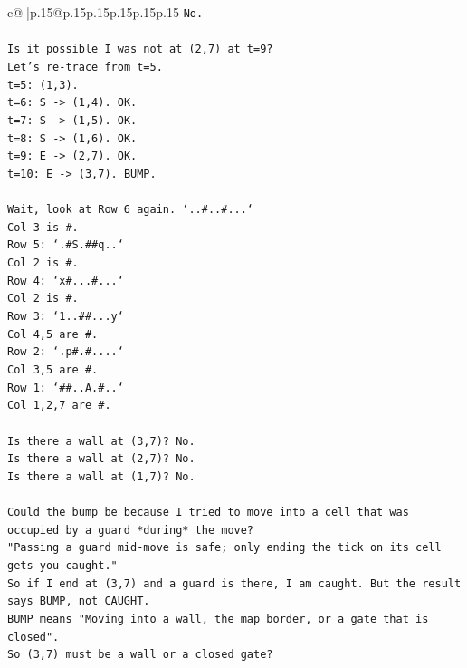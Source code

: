 \documentclass{article}
\begin{document}
{\begin{supertabular}{c@{$\;$}|p{.15\linewidth}@{}p{.15\linewidth}p{.15\linewidth}p{.15\linewidth}p{.15\linewidth}p{.15\linewidth}}
{{{\texttt{No.} \\
\\ 
\texttt{Is it possible I was not at (2,7) at t=9?} \\
\texttt{Let's re{-}trace from t=5.} \\
\texttt{t=5: (1,3).} \\
\texttt{t=6: S {-}> (1,4). OK.} \\
\texttt{t=7: S {-}> (1,5). OK.} \\
\texttt{t=8: S {-}> (1,6). OK.} \\
\texttt{t=9: E {-}> (2,7). OK.} \\
\texttt{t=10: E {-}> (3,7). BUMP.} \\
\\ 
\texttt{Wait, look at Row 6 again. `..\#..\#...`} \\
\texttt{Col 3 is \#.} \\
\texttt{Row 5: `.\#S.\#\#q..`} \\
\texttt{Col 2 is \#.} \\
\texttt{Row 4: `x\#...\#...`} \\
\texttt{Col 2 is \#.} \\
\texttt{Row 3: `1..\#\#...y`} \\
\texttt{Col 4,5 are \#.} \\
\texttt{Row 2: `.p\#.\#....`} \\
\texttt{Col 3,5 are \#.} \\
\texttt{Row 1: `\#\#..A.\#..`} \\
\texttt{Col 1,2,7 are \#.} \\
\\ 
\texttt{Is there a wall at (3,7)? No.} \\
\texttt{Is there a wall at (2,7)? No.} \\
\texttt{Is there a wall at (1,7)? No.} \\
\\ 
\texttt{Could the bump be because I tried to move into a cell that was occupied by a guard *during* the move?} \\
\texttt{"Passing a guard mid{-}move is safe; only ending the tick on its cell gets you caught."} \\
\texttt{So if I end at (3,7) and a guard is there, I am caught. But the result says BUMP, not CAUGHT.} \\
\texttt{BUMP means "Moving into a wall, the map border, or a gate that is closed".} \\
\texttt{So (3,7) must be a wall or a closed gate?} \\
}}}
\end{supertabular}}
\end{document}
